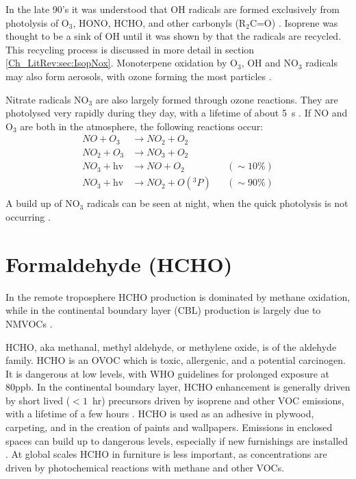     In the late 90's it was understood that OH radicals are formed exclusively from photolysis of O$_3$, HONO, HCHO, and other carbonyls (R$_2$C=O) \citet{Atkinson2000}.
    Isoprene was thought to be a sink of OH until it was shown by \cite{Paulot2009b} that the radicals are recycled.
    This recycling process is discussed in more detail in section \ref{Ch_LitRev:sec:IsopNox}.
    Monoterpene oxidation by O$_3$, OH and NO$_3$ radicals may also form aerosols, with ozone forming the most particles \citep{Kanakidou2005}.

    Nitrate radicals NO$_3$ are also largely formed through ozone reactions.
    They are photolysed very rapidly during they day, with a lifetime of about 5~s \citep{Atkinson2000}.
    If NO and O$_3$ are both in the atmosphere, the following reactions \citep{Atkinson2000} occur:
    \begin{align*}
      NO + O_3         & \to NO_2 + O_2      && \\%
      NO_2 + O_3       & \to NO_3 + O_2      && \\%
      NO_3 + \text{hv} & \to NO + O_2        && (\sim 10\%) \\%
      NO_3 + \text{hv} & \to NO_2 + O({}^3P) && (\sim 90\%) \\%
    \end{align*}
    A build up of NO$_3$ radicals can be seen at night, when the quick photolysis is not occurring \citep{Atkinson2000,Brown2009}.

\section{Formaldehyde (HCHO)}
  \label{LR:O3andAQ:HCHO}
  
  In the remote troposphere HCHO production is dominated by methane oxidation, while in the continental boundary layer (CBL) production is largely due to NMVOCs \citep{Abbot2003, Kefauver2014}.
  
  HCHO, aka methanal, methyl aldehyde, or methylene oxide, is of the aldehyde family.
  HCHO is an OVOC which is toxic, allergenic, and a potential carcinogen. 
  It is dangerous at low levels, with WHO guidelines for prolonged exposure at 80ppb.
  In the continental boundary layer, HCHO enhancement is generally driven by short lived ($<1$~hr) precursors driven by isoprene and other VOC emissions, with a lifetime of a few hours \citep{Kefauver2014}.
  HCHO is used as an adhesive in plywood, carpeting, and in the creation of paints and wallpapers.
  Emissions in enclosed spaces can build up to dangerous levels, especially if new furnishings are installed \citep{Davenport2015}.
  At global scales HCHO in furniture is less important, as concentrations are driven by photochemical reactions with methane and other VOCs.
  

